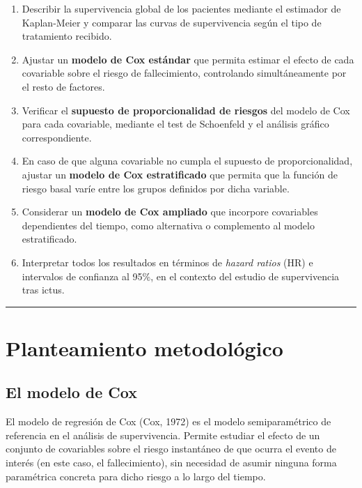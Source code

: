 \documentclass[
]{article}
\begin{document}
\begin{enumerate}
\def\labelenumi{\arabic{enumi}.}
\item
  Describir la supervivencia global de los pacientes mediante el
  estimador de Kaplan-Meier y comparar las curvas de supervivencia según
  el tipo de tratamiento recibido.
\item
  Ajustar un \textbf{modelo de Cox estándar} que permita estimar el
  efecto de cada covariable sobre el riesgo de fallecimiento,
  controlando simultáneamente por el resto de factores.
\item
  Verificar el \textbf{supuesto de proporcionalidad de riesgos} del
  modelo de Cox para cada covariable, mediante el test de Schoenfeld y
  el análisis gráfico correspondiente.
\item
  En caso de que alguna covariable no cumpla el supuesto de
  proporcionalidad, ajustar un \textbf{modelo de Cox estratificado} que
  permita que la función de riesgo basal varíe entre los grupos
  definidos por dicha variable.
\item
  Considerar un \textbf{modelo de Cox ampliado} que incorpore
  covariables dependientes del tiempo, como alternativa o complemento al
  modelo estratificado.
\item
  Interpretar todos los resultados en términos de \emph{hazard ratios}
  (HR) e intervalos de confianza al 95\%, en el contexto del estudio de
  supervivencia tras ictus.
\end{enumerate}

\begin{center}\rule{0.5\linewidth}{0.5pt}\end{center}

\hypertarget{planteamiento-metodoluxf3gico}{%
\section{Planteamiento
metodológico}\label{planteamiento-metodoluxf3gico}}

\hypertarget{el-modelo-de-cox}{%
\subsection{El modelo de Cox}\label{el-modelo-de-cox}}

El modelo de regresión de Cox (Cox, 1972) es el modelo semiparamétrico
de referencia en el análisis de supervivencia. Permite estudiar el
efecto de un conjunto de covariables sobre el riesgo instantáneo de que
ocurra el evento de interés (en este caso, el fallecimiento), sin
necesidad de asumir ninguna forma paramétrica concreta para dicho riesgo
a lo largo del tiempo.
\end{document}
